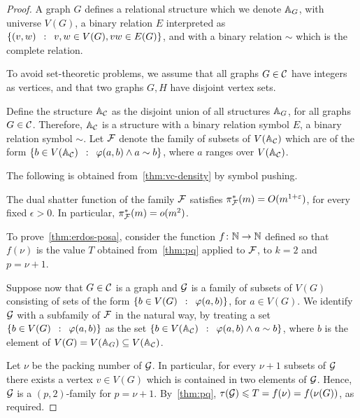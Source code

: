 \begin{proof}\label{thm:erdos-posa}
	A graph $G$ %
	defines a relational structure which we denote 
	$\str A_{G}$, with universe $V(G)$,
	a binary relation $E$ interpreted as $\setof{(v,w)}{v,w\in V(G),vw\in E(G)}$,  
	and with a binary relation $\sim$ which is the complete relation.
	
	To avoid set-theoretic problems, we assume that all graphs $G\in \CCC$ have integers as vertices, and that two graphs $G,H$ have disjoint vertex sets.
	
	Define the structure $\str A_{\CCC}$ as the disjoint union of all structures $\str A_{G}$,
	for all graphs $G\in \CCC$. Therefore, $\str A_{\CCC}$
	is a structure with a binary relation symbol $E$,
	a binary relation symbol $\sim$. Let $\cal F$ denote the
	family of subsets of $V(\str A_{\CCC})$
which are of the form
$\setof{b\in V(\str A_{\CCC})} {\phi(a,b)\land a\sim b}$, where $a$ ranges over  $V(\str A_{\CCC})$.

The following is obtained from~\cref{thm:vc-density} by symbol pushing.
\begin{claim}
	The dual shatter function of the family $\cal F$ satisfies	$\pi^*_{\cal F}(m)=O(m^{1+\epsilon})$,
	 for every fixed $\epsilon>0$.
In particular, $\pi^*_{\cal F}(m)=o(m^{2})$.
\end{claim}

To prove~\cref{thm:erdos-posa},
consider the function $f\from \N \to \N$
defined so that $f(\nu)$ is the value $T$ obtained from~\cref{thm:pq} applied to $\cal F$, to $k=2$ and $p=\nu+1$.

Suppose now that $G\in \CCC$ is a graph and $\GGG$
is a family of subsets of $V(G)$ consisting of sets of the form $\setof{b\in V(G)}{\phi(a,b)}$, for $a\in V(G)$.
We identify $\GGG$ with a subfamily of $\FFF$ in the natural way, by treating a set $\setof{b\in V(G)}{\phi(a,b)}$
as the set $\setof{b\in V(\str A_{\cal C})}{\phi(a,b)\land a\sim b}$,
where $b$ is the element of $V(G)=V(\str A_G)\subset V(\str A_{\CCC})$.

Let $\nu$ be the packing number of $\GGG$.
In particular, for every $\nu+1$ subsets of $\GGG$
there exists a vertex $v\in V(G)$
which is contained in two elements of $\GGG$.
Hence, $\GGG$ is a $(p,2)$-family for $p=\nu+1$.
By~\cref{thm:pq}, $\tau(\GGG)\le T=f(\nu)=f(\nu(G))$,  as required.
\end{proof}